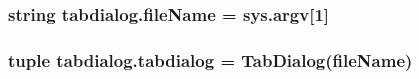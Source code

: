 \subsubsection[{file\+Name}]{\setlength{\rightskip}{0pt plus 5cm}string tabdialog.\+file\+Name = sys.\+argv\mbox{[}1\mbox{]}}\label{namespacetabdialog_ad3724c3a0fb87aea18a10ae5c6832585}
\hypertarget{namespacetabdialog_a39837390b8f6b77d1aeabf2eb04ca680}{}
\subsubsection[{tabdialog}]{\setlength{\rightskip}{0pt plus 5cm}tuple tabdialog.\+tabdialog = {\bf Tab\+Dialog}({\bf file\+Name})}\label{namespacetabdialog_a39837390b8f6b77d1aeabf2eb04ca680}
